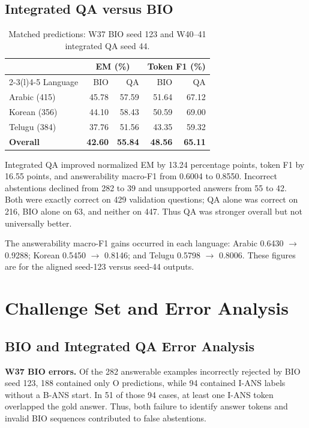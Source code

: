 \documentclass[11pt,a4paper,twocolumn]{article}
\begin{document}
\subsection{Integrated QA versus BIO}
\begin{table}[htbp]
\centering\scriptsize
\setlength{\tabcolsep}{3pt}
\begin{tabular}{@{}lrrrr@{}}
\toprule
 & \multicolumn{2}{c}{EM (\%)} & \multicolumn{2}{c}{Token F1 (\%)} \\
\cmidrule(lr){2-3}\cmidrule(l){4-5}
Language & BIO & QA & BIO & QA \\
\midrule
Arabic (415) & 45.78 & 57.59 & 51.64 & 67.12 \\
Korean (356) & 44.10 & 58.43 & 50.59 & 69.00 \\
Telugu (384) & 37.76 & 51.56 & 43.35 & 59.32 \\
\textbf{Overall} & \textbf{42.60} & \textbf{55.84} & \textbf{48.56} & \textbf{65.11} \\
\bottomrule
\end{tabular}
\caption{Matched predictions: W37 BIO seed 123 and W40--41 integrated QA seed 44.}
\label{tab:qa}
\end{table}

Integrated QA improved normalized EM by 13.24 percentage points, token F1 by 16.55 points, and answerability macro-F1 from 0.6004 to 0.8550. Incorrect abstentions declined from 282 to 39 and unsupported answers from 55 to 42. Both were exactly correct on 429 validation questions; QA alone was correct on 216, BIO alone on 63, and neither on 447. Thus QA was stronger overall but not universally better.

The answerability macro-F1 gains occurred in each language: Arabic 0.6430 $\rightarrow$ 0.9288; Korean 0.5450 $\rightarrow$ 0.8146; and Telugu 0.5798 $\rightarrow$ 0.8006. These figures are for the aligned seed-123 versus seed-44 outputs.

\section{Challenge Set and Error Analysis}

\subsection{BIO and Integrated QA Error Analysis}

\textbf{W37 BIO errors.}
Of the 282 answerable examples incorrectly rejected
by BIO seed 123, 188 contained only O predictions,
while 94 contained I-ANS labels without a B-ANS
start. In 51 of those 94 cases, at least one I-ANS
token overlapped the gold answer. Thus, both
failure to identify answer tokens and invalid
BIO sequences contributed to false abstentions.
\end{document}

